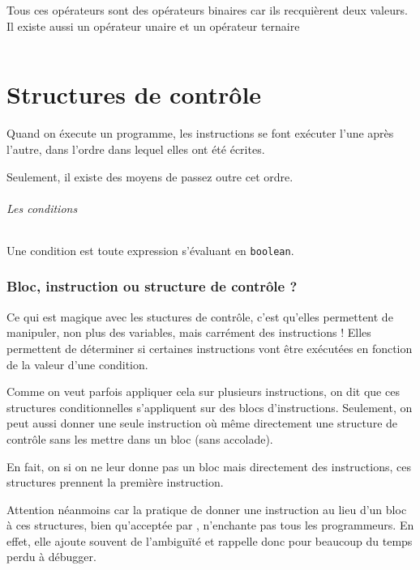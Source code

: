 Tous ces opérateurs sont des opérateurs binaires car ils recquièrent deux
valeurs.
Il existe aussi un opérateur unaire et un opérateur ternaire
\begin{center}
  \begin{tabular}{|c|l|}
    \hline
    \hline
    \hline
  \end{tabular}
\end{center}

\part{Structures de contrôle}
Quand on éxecute un programme, les instructions se font exécuter l'une après
l'autre, dans l'ordre dans lequel elles ont été écrites.

Seulement, il existe des moyens de passez outre cet ordre.

\paragraph{Les conditions}
Une condition est toute expression s'évaluant en \lstinline|boolean|.

\section{Bloc, instruction ou structure de contrôle ?}
\label{sec:bloci}
Ce qui est magique avec les stuctures de contrôle, c'est qu'elles permettent
de manipuler, non plus des variables, mais carrément des instructions !
Elles permettent de déterminer si certaines instructions vont être exécutées
en fonction de la valeur d'une condition.

Comme on veut parfois appliquer cela sur plusieurs instructions,
on dit que ces structures conditionnelles s'appliquent sur
des blocs d'instructions.
Seulement, on peut aussi donner une seule instruction où même directement
une structure de contrôle sans les mettre dans un bloc (sans accolade).

En fait, on si on ne leur donne pas un bloc mais directement des instructions,
ces structures prennent la première instruction.

Attention néanmoins car la pratique de donner une instruction au lieu d'un
bloc à ces structures, bien qu'acceptée par \java{}, n'enchante pas
tous les programmeurs.
En effet, elle ajoute souvent de l'ambiguïté et rappelle donc pour beaucoup
du temps perdu à débugger.

